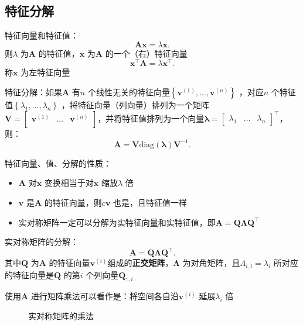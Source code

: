 \subsection{特征分解}%
\label{sub:特征分解}
\begin{defi}
    特征向量和特征值：\[
        \bm{A}\bm{x}=\lambda\bm{x}
    .\]
    则$\lambda$ 为$\bm{A}$ 的特征值，$\bm{x}$ 为$\bm{A}$ 的一个（右）特征向量
    \[
        \bm{x}^\top \bm{A}=\lambda\bm{x}^\top 
    .\]
    称$\bm{x}$ 为左特征向量
\end{defi}
\begin{defi}
    特征分解：如果$\bm{A}$ 有$n$ 个线性无关的特征向量$\left\{ \bm{v}^{\left( 1 \right)},\ldots ,\bm{v}^{\left( n \right)} \right\}$ ，对应$n$ 个特征值$\left\{ \lambda_1,\ldots ,\lambda_{n} \right\}$ ，将特征向量（列向量）排列为一个矩阵$\bm{V}=\begin{bmatrix}
        \bm{v}^{(1)} & \ldots & \bm{v}^{(n)}\\
    \end{bmatrix}$，并将特征值排列为一个向量$\bm{\lambda}=\begin{bmatrix}
        \lambda_1 & \ldots & \lambda_{n}
    \end{bmatrix}^\top $，则：\[
        \bm{A}=\bm{V}\mathrm{diag}(\bm{\lambda})\bm{V}^{-1}
    .\]
\end{defi}
特征向量、值、分解的性质：
\begin{itemize}
    \item $\bm{A}$ 对$\bm{x}$ 变换相当于对$\bm{x}$ 缩放$\lambda$ 倍
    \item $\bm{v}$ 是$\bm{A}$ 的特征向量，则$c\bm{v}$ 也是，且特征值一样
    \item 实对称矩阵一定可以分解为实特征向量和实特征值，即$\bm{A}=\bm{Q\Lambda Q}^\top $
\end{itemize}
\begin{notation}
    实对称矩阵的分解：\[
        \bm{A}=\bm{Q\Lambda Q}^\top  
    .\]
    其中$\bm{Q}$ 为$\bm{A}$ 的特征向量$\bm{v}^{(i)}$组成的\textbf{正交矩阵}，$\bm{\Lambda}$ 为对角矩阵，且$\Lambda_{i,i}=\lambda_{i}$ 所对应的特征向量是$\bm{Q}$ 的第$i$ 个列向量$\bm{Q}_{:,i}$
\end{notation}
使用$\bm{A}$ 进行矩阵乘法可以看作是：将空间各自沿$\bm{v}^{\left( i \right)}$ 延展$\lambda_{i}$ 倍
\begin{figure}[ht]
    \centering
    \caption{实对称矩阵的乘法}
    \label{fig:实对称矩阵的乘法}
\end{figure}
